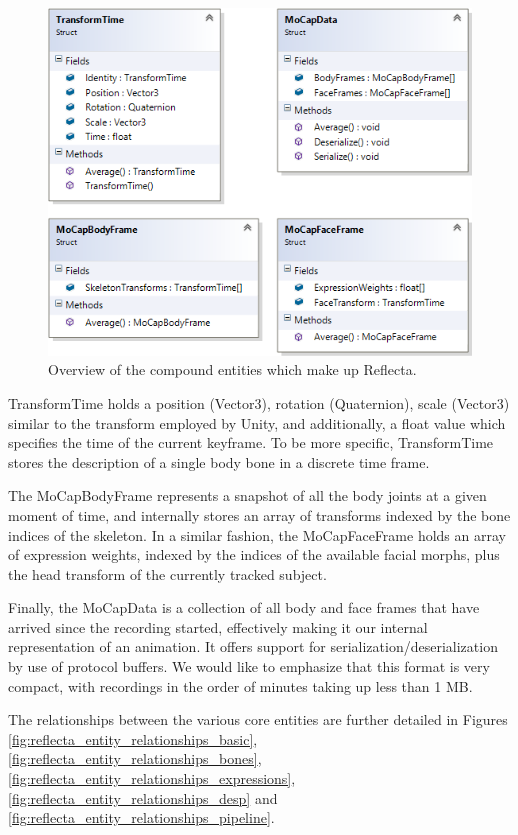 \documentclass[a4paper, 12pt]{amsart}
\begin{document}
\begin{figure}[htb]
\centering
\includegraphics[width=.9\linewidth]{fig_reflecta_compound_entities}
\caption{Overview of the compound entities which make up Reflecta.}
\label{fig:reflecta_compound_entities}
\end{figure}

TransformTime holds a position (Vector3), rotation (Quaternion), scale (Vector3) similar to the transform employed by Unity, and additionally, a float value which specifies the time of the current keyframe. To be more specific, TransformTime stores the description of a single body bone in a discrete time frame.

The MoCapBodyFrame represents a snapshot of all the body joints at a given moment of time, and internally stores an array of transforms indexed by the bone indices of the skeleton. In a similar fashion, the MoCapFaceFrame holds an array of expression weights, indexed by the indices of the available facial morphs, plus the head transform of the currently tracked subject.

Finally, the MoCapData is a collection of all body and face frames that have arrived since the recording started, effectively making it our internal representation of an animation. It offers support for serialization/deserialization by use of protocol buffers. We would like to emphasize that this format is very compact, with recordings in the order of minutes taking up less than 1 MB.

The relationships between the various core entities are further detailed in Figures \ref{fig:reflecta_entity_relationships_basic}, \ref{fig:reflecta_entity_relationships_bones}, \ref{fig:reflecta_entity_relationships_expressions}, \ref{fig:reflecta_entity_relationships_desp} and \ref{fig:reflecta_entity_relationships_pipeline}.
\end{document}
